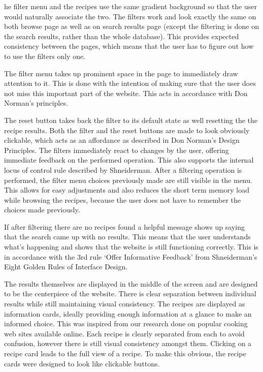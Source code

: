 he filter menu and the recipes use the same gradient background so that the user would naturally associate the two. The filters work and look exactly the same on both browse page as well as on search results page (except the filtering is done on the search results, rather than the whole database). This provides expected consistency between the pages, which means that the user has to figure out how to use the filters only one.

The filter menu takes up prominent space in the page to immediately draw attention to it. This is done with the intention of making sure that the user does not miss this important part of the website. This acts in accordance with Don Norman’s principles.

The reset button takes back the filter to its default state as well resetting the the recipe results. Both the filter and the reset buttons are made to look obviously clickable, which acts as an affordance as described in Don Norman’s Design Principles. The filters immediately react to changes by the user, offering immediate feedback on the performed operation. This also supports the internal locus of control rule described by Shneiderman. After a filtering operation is performed, the filter menu choices previously made are still visible in the menu. This allows for easy adjustments and also reduces the short term memory load while browsing the recipes, because the user does not have to remember the choices made previously.

If after filtering there are no recipes found a helpful message shows up saying that the search came up with no results. This means that the user understands what’s happening and shows that the website is still functioning correctly. This is in accordance with the 3rd rule ‘Offer Informative Feedback’ from  Shneiderman’s Eight Golden Rules of Interface Design. 

The results themselves are displayed in the middle of the screen and are designed to be the centerpiece of the website. There is clear separation between individual results while still maintaining visual consistency. The recipes are displayed as information cards, ideally providing enough information at a glance to make an informed choice. This was inspired from our research done on popular cooking web sites available online. Each recipe is clearly separated from each to avoid confusion, however there is still visual consistency amongst them. Clicking on a recipe card leads to the full view of a recipe. To make this obvious, the recipe cards were designed to look like clickable buttons.